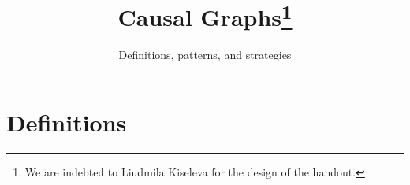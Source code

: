 

\usepackage{graphicx}
\newcommand\sbullet[1][.5]{\mathbin{\vcenter{\hbox{\scalebox{#1}{$\bullet$}}}}}
\usepackage[export]{adjustbox}

\title{Causal Graphs\thanks{We are indebted to Liudmila Kiseleva for the design of the handout.}}
\subtitle{Definitions, patterns, and strategies}
\date{}

\maketitle\vspace{-2cm}

\section*{Definitions}

